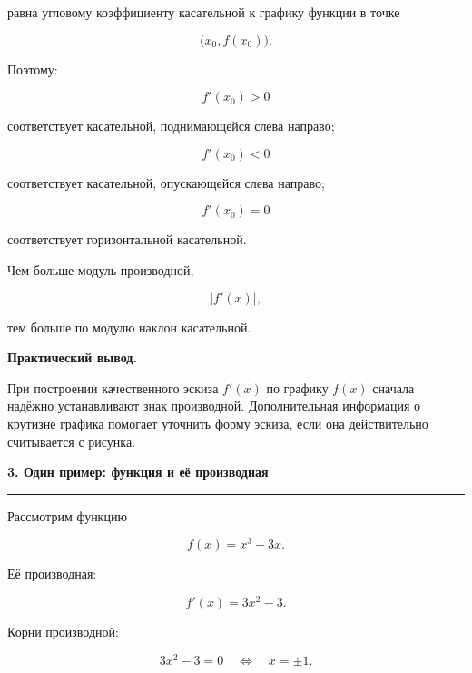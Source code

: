 \documentclass[a4paper,12pt]{article}
\newcommand{\maintitle}[1]{%
    {\Large\bfseries\color{darkaccent}#1\par}
    \vspace{2mm}
    {\color{accent}\rule{\linewidth}{0.6pt}}
    \vspace{4mm}
}
\newcommand{\keypoint}[1]{%
    \par
    \vspace{1mm}
    {\color{darkaccent}\bfseries #1}
}
\begin{document}
равна угловому коэффициенту касательной к графику функции в точке

\[
\bigl(x_0,f(x_0)\bigr).
\]

Поэтому:

\[
f'(x_0)>0
\]

соответствует касательной, поднимающейся слева направо;

\[
f'(x_0)<0
\]

соответствует касательной, опускающейся слева направо;

\[
f'(x_0)=0
\]

соответствует горизонтальной касательной.

Чем больше модуль производной,

\[
|f'(x)|,
\]

тем больше по модулю наклон касательной.

\keypoint{Практический вывод.}
При построении качественного эскиза \(f'(x)\) по графику \(f(x)\)
сначала надёжно устанавливают знак производной.
Дополнительная информация о крутизне графика помогает уточнить форму
эскиза, если она действительно считывается с рисунка.

\maintitle{3. Один пример: функция и её производная}

Рассмотрим функцию

\[
f(x)=x^3-3x.
\]

Её производная:

\[
f'(x)=3x^2-3.
\]

Корни производной:

\[
3x^2-3=0
\quad\Longleftrightarrow\quad
x=\pm1.
\]

\begin{center}
\end{center}
\end{document}

